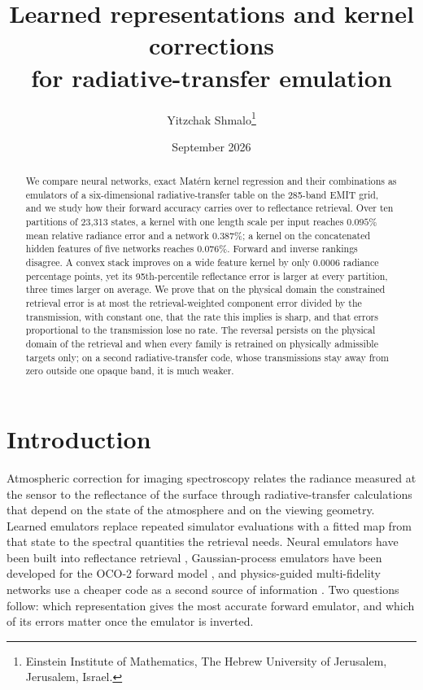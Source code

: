 \documentclass[11pt]{article}
\title{Learned representations and kernel corrections\\ for radiative-transfer emulation}
\author{Yitzchak Shmalo\thanks{Einstein Institute of Mathematics, The Hebrew University of Jerusalem, Jerusalem, Israel.}}
\date{September 2026}
\newcommand{\1}{\mathbf{1}}
\begin{document}
\maketitle

\begin{abstract}
We compare neural networks, exact Mat\'ern kernel regression and their combinations as
emulators of a six-dimensional radiative-transfer table on the 285-band EMIT grid, and we
study how their forward accuracy carries over to reflectance retrieval. Over ten partitions
of 23{,}313 states, a kernel with one length scale per input reaches $0.095\%$ mean relative
radiance error and a network $0.387\%$; a kernel on the concatenated hidden features of five
networks reaches $0.076\%$. Forward and inverse rankings disagree. A convex stack improves on
a wide feature kernel by only $0.0006$ radiance percentage points, yet its 95th-percentile
reflectance error is larger at every partition, three times larger on average. We prove that on the physical domain
the constrained retrieval error is at most the retrieval-weighted component error divided by
the transmission, with constant one, that the rate this implies is sharp, and that errors
proportional to the transmission lose no rate. The reversal persists on the physical domain of the retrieval and when every family is retrained on physically admissible targets only; on a second radiative-transfer code, whose transmissions stay away from zero outside one opaque band, it is much weaker.
\end{abstract}

\section{Introduction}

Atmospheric correction for imaging spectroscopy relates the radiance measured at the sensor
to the reflectance of the surface through radiative-transfer calculations that depend on the
state of the atmosphere and on the viewing geometry. Learned emulators replace repeated
simulator evaluations with a fitted map from that state to the spectral quantities the
retrieval needs. Neural emulators have been built into reflectance retrieval
\cite{srtmnet}, Gaussian-process emulators have been developed for the OCO-2 forward
model \cite{lamminpaa}, and physics-guided multi-fidelity networks use a cheaper code as a
second source of information \cite{pkan}. Two questions follow: which representation gives
the most accurate forward emulator, and which of its errors matter once the emulator is
inverted.
\end{document}
